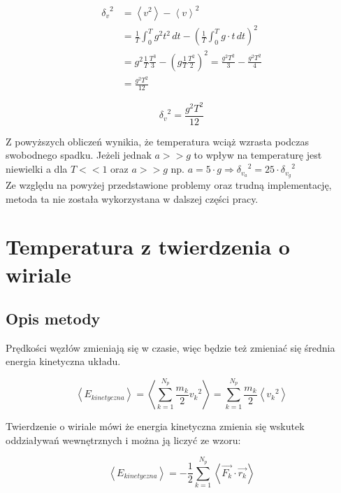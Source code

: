 \documentclass[12pt, letterpaper]{report}
\begin{document}
    \begin{align*}
        {\delta_v}^2  &=
        \left< v^2 \right> - \left< v \right>^2 \\ 
        &=  \frac{1}{T} \int_{0}^{T} g^2 t^2 \, dt  -  \left( \frac{1}{T} \int_{0}^{T} g \cdot t \, dt \right)^2  \\
        &=  g^2 \frac{1}{T} \frac{T^3}{3}  -  \left( g \frac{1}{T} \frac{T^2}{2} \right)^2  = \frac{g^2 T^2}{3}  -  \frac{g^2 T^2}{4} \\
        &=  \frac{g^2 T^2}{12}
    \end{align*}

    \begin{equation}
        {\delta_v}^2  =  \frac{g^2 T^2}{12}
    \end{equation}

    Z powyższych obliczeń wynikia, że temperatura wciąż wzrasta podczas swobodnego spadku. 
    Jeżeli jednak $a >> g$ to wpływ na temperaturę jest niewielki a dla $T << 1$ oraz $a >> g$ 
    np. $a = 5 \cdot g \Rightarrow {\delta_{v_a}}^2 = 25 \cdot {\delta_{v_g}}^2$ \\

    Ze względu na powyżej przedstawione problemy oraz trudną implementację, metoda ta nie została wykorzystana
    w dalszej części pracy.

    \section{Temperatura z twierdzenia o wiriale}
    \subsection{Opis metody}
    Prędkości węzłów zmieniają się w czasie, więc będzie też zmieniać się średnia energia kinetyczna układu.

    \begin{equation}
        \left< E_{kinetyczna} \right>  =  \left< \sum_{k = 1}^{N_p} \frac{m_k}{2} {v_k}^2 \right>
        = \sum_{k = 1}^{N_p} \frac{m_k}{2} \left< {v_k}^2 \right>
    \end{equation}

    Twierdzenie o wiriale mówi że energia kinetyczna zmienia się wskutek oddziaływań wewnętrznych i można ją 
    liczyć ze wzoru:

    \begin{equation}
        \left< E_{kinetyczna} \right>  = 
         - \frac{1}{2} \sum_{k = 1}^{N_p} \left< \vec{F_k} \cdot \vec{r_k} \right>
    \end{equation}
\end{document}
